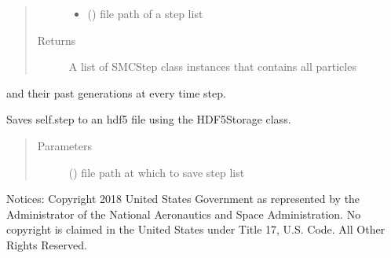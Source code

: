 \documentclass[letterpaper,10pt,english]{sphinxmanual}
\begin{document}
\begin{fulllineitems}
\begin{fulllineitems}
\begin{quote}
\begin{description}
\begin{itemize}
\item {} 
 () \textendash{} file path of a step list

\end{itemize}

\item[{Returns}] \leavevmode
A list of SMCStep class instances that contains all particles

\end{description}\end{quote}

and their past generations at every time step.

\end{fulllineitems}


\begin{fulllineitems}
\label{\detokenize{source_code:smcpy.smc.smc_sampler.SMCSampler.save_step_list}}
Saves self.step to an hdf5 file using the HDF5Storage class.
\begin{quote}\begin{description}
\item[{Parameters}] \leavevmode
{} () \textendash{} file path at which to save step list

\end{description}\end{quote}

\end{fulllineitems}


\end{fulllineitems}

\label{\detokenize{source_code:module-smcpy.smc.smc_step}}
Notices:
Copyright 2018 United States Government as represented by the Administrator of
the National Aeronautics and Space Administration. No copyright is claimed in
the United States under Title 17, U.S. Code. All Other Rights Reserved.
\end{document}
